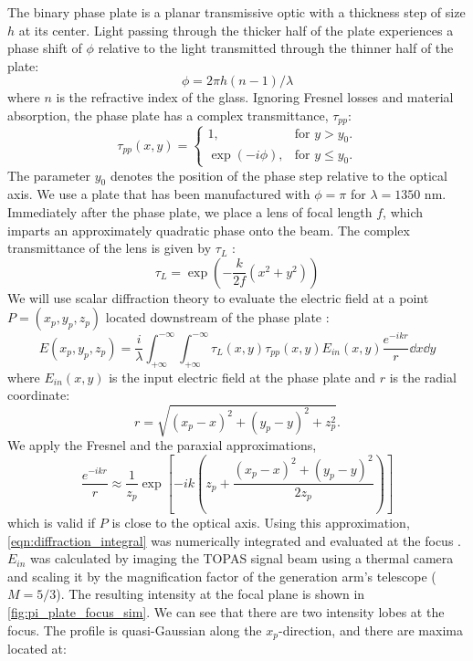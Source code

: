 The binary phase plate is a planar transmissive optic with a thickness step of size $h$ at its center. Light passing through the thicker half of the plate experiences a phase shift of $\phi$ relative to the light transmitted through the thinner half of the plate:
\begin{equation}
\phi = 2 \pi h (n-1)/\lambda
\end{equation}
where $n$ is the refractive index of the glass. Ignoring Fresnel losses and material absorption, the phase plate has a complex transmittance, $\tau_{pp}$:
\begin{equation}
\tau_{pp} (x, y) =  \begin{cases}
1, & \textrm{for $y > y_0$}.\\
\exp (-i \phi), & \textrm{for $y \le y_0$}.
\end{cases}
\label{eqn:phase-plate-transmission}
\end{equation}
The parameter $y_0$ denotes the position of the phase step relative to the optical axis. We use a plate that has been manufactured with $\phi=\pi$ for $\lambda = 1350 \textrm{ nm}$. Immediately after the phase plate, we place a lens of focal length $f$, which imparts an approximately quadratic phase onto the beam. The complex transmittance of the lens is given by $\tau_L$ \cite{goodmanIntroductionFourierOptics1996}:
\begin{equation}
\tau_L = \exp \left( - \frac{k}{2 f} (x^2 + y^2) \right)
\label{eqn:complex_transmittance_lens}
\end{equation}
We will use scalar diffraction theory to evaluate the electric field at a point $P=(x_p, y_p, z_p)$ located downstream of the phase plate \cite{passillySimpleInterferometricTechnique2005}:
\begin{equation}
E(x_p, y_p, z_p) = \frac{i}{\lambda} \int_{+ \infty}^{- \infty} \int_{+ \infty}^{- \infty} \tau_{L} (x,y) \tau_{pp} (x,y) E_{in} (x,y) \frac{e^{-i k r}}{r} \dd{x} \dd{y}
\label{eqn:diffraction_integral}
\end{equation}
where $E_{in}(x,y)$ is the input electric field at the phase plate and $r$ is the radial coordinate:
$$
r = \sqrt{(x_p-x)^2 + (y_p-y)^2 + z_p^2}.
$$
We apply the Fresnel and the paraxial approximations,
\begin{equation}
\frac{e^{-i k r}}{r} \approx \frac{1}{z_p} \exp \left[-ik \left(z_p + \frac{(x_p-x)^2 + (y_p-y)^2}{2z_p} \right) \right]
\label{eqn:fresnel_paraxial_approx}
\end{equation}
which is valid if $P$ is close to the optical axis. Using this approximation, \cref{eqn:diffraction_integral} was numerically integrated and evaluated at the focus \cite{vdovinLightPipesPython}. $E_{in}$ was calculated by imaging the TOPAS signal beam using a thermal camera and scaling it by the magnification factor of the generation arm's telescope (${M=5/3}$). The resulting intensity at the focal plane is shown in \cref{fig:pi_plate_focus_sim}. We can see that there are two intensity lobes at the focus. The profile is quasi-Gaussian along the $x_p$-direction, and there are maxima located at:
